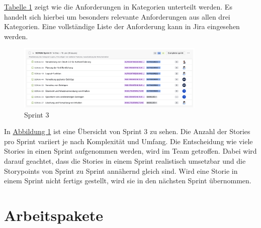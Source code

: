 \hyperref[tab:tab-1]{Tabelle 1} zeigt wie die Anforderungen in Kategorien unterteilt werden. Es handelt sich hierbei um besonders relevante Anforderungen aus
allen drei Kategorien. Eine vollständige Liste der Anforderung kann in Jira eingesehen werden.

\begin{figure}[htb]
    \centering
    \includegraphics[width=0.8\textwidth]{graphics/sprint_3_jira.png}
    \caption{Sprint 3}
    \label{fig:fig-1}
\end{figure}

In \hyperref[fig:fig-1]{Abbildung 1} ist eine Übersicht von Sprint 3 zu sehen. Die Anzahl der Stories pro Sprint variiert je nach Komplexität und Umfang.
Die Entscheidung wie viele Stories in einen Sprint aufgenommen werden, wird im Team getroffen. Dabei wird darauf geachtet, dass die Stories in einem Sprint
realistisch umsetzbar und die Storypoints von Sprint zu Sprint annähernd gleich sind. Wird eine Storie in einem Sprint nicht fertigs gestellt, wird sie in
den nächsten Sprint übernommen.

\section{Arbeitspakete}
\label{sec:chapter1-2}
